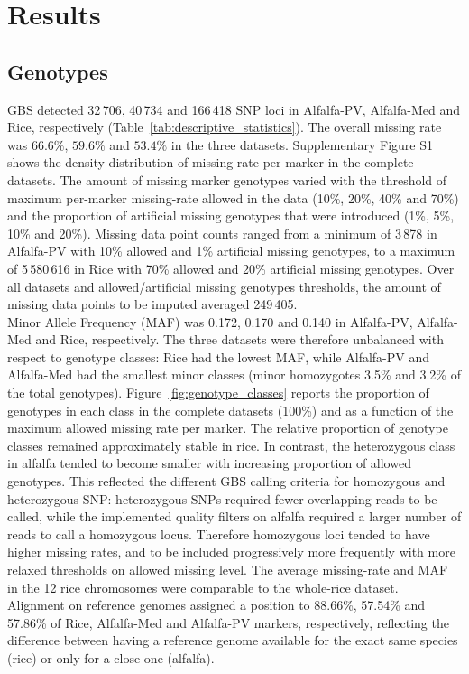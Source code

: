 \section{Results}
\label{sec:results}

\subsection{Genotypes}
\label{sec:genotypes}  
GBS detected 32\,706, 40\,734 and 166\,418 SNP loci in Alfalfa-PV, Alfalfa-Med and Rice, respectively (Table~\ref{tab:descriptive_statistics}). The overall missing rate was $66.6\%$, $59.6\%$ and $53.4\%$ in the three datasets. Supplementary Figure S1 shows the density distribution of missing rate per marker in the complete datasets. The amount of missing marker genotypes varied with the threshold of maximum per-marker missing-rate allowed in the data (10\%, 20\%, 40\% and 70\%) and the proportion of artificial missing genotypes that were introduced (1\%, 5\%, 10\% and 20\%). Missing data point counts ranged from a minimum of 3\,878 in Alfalfa-PV with 10\% allowed and 1\% artificial missing genotypes, to a maximum of 5\,580\,616 in Rice with 70\% allowed and 20\% artificial missing genotypes. Over all datasets and allowed/artificial missing genotypes thresholds, the amount of missing data points to be imputed averaged 249\,405.\\
Minor Allele Frequency (MAF) was 0.172, 0.170 and 0.140 in Alfalfa-PV, Alfalfa-Med and Rice, respectively. The three datasets were therefore unbalanced with respect to genotype classes: Rice had the lowest MAF, while Alfalfa-PV and Alfalfa-Med had the smallest minor classes (minor homozygotes 3.5\% and 3.2\% of the total genotypes). Figure~\ref{fig:genotype_classes} reports the proportion of genotypes in each class in the complete datasets (100\%) and as a function of the maximum allowed missing rate per marker. The relative proportion of genotype classes remained approximately stable in rice. In contrast, the heterozygous class in alfalfa tended to become smaller with increasing proportion of allowed genotypes. This reflected the different GBS calling criteria for homozygous and heterozygous SNP: heterozygous SNPs required fewer overlapping reads to be called, while the implemented quality filters on alfalfa required a larger number of reads to call a homozygous locus. Therefore homozygous loci tended to have higher missing rates, and to
be included progressively more frequently with more relaxed thresholds on allowed missing level.
The average missing-rate and MAF in the 12 rice chromosomes were comparable to the whole-rice dataset.\\
Alignment on reference genomes assigned a position to 88.66\%, 57.54\% and 57.86\% of Rice, Alfalfa-Med and Alfalfa-PV markers, respectively, reflecting the difference between having a reference genome available for the exact same species (rice) or only for a close one (alfalfa).

